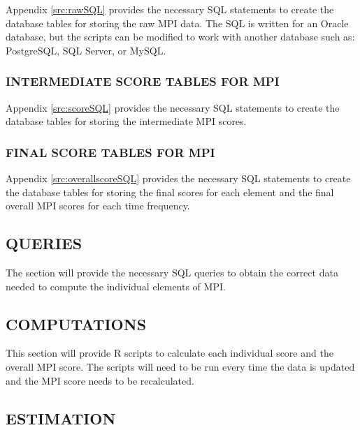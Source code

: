 \documentclass[SDSUThesis.tex]{subfiles}
\begin{document}
        Appendix \ref{src:rawSQL} provides the necessary SQL statements to create the 
        database tables for storing the raw MPI data.  The SQL is written for an Oracle
        database, but the scripts can be modified to work with another database
        such as: PostgreSQL, SQL Server, or MySQL.  
        
    \subsubsection{INTERMEDIATE SCORE TABLES FOR MPI}
    
        Appendix \ref{src:scoreSQL} provides the necessary SQL statements to create the 
        database tables for storing the intermediate MPI scores.
    
    \subsubsection{FINAL SCORE TABLES FOR MPI}
    
        Appendix \ref{src:overallscoreSQL} provides the necessary SQL statements to create the 
        database tables for storing the final scores for each element and the final 
        overall MPI scores for each time frequency.

\subsection{QUERIES}
    The section will provide the necessary SQL queries to obtain the correct data
    needed to compute the individual elements of MPI.
    
\subsection{COMPUTATIONS}
    This section will provide R scripts to calculate each individual score and the overall 
    MPI score. The scripts will need to be run every time the data is updated and the MPI
    score needs to be recalculated.


    \subsection{ESTIMATION}
    
\end{document}
